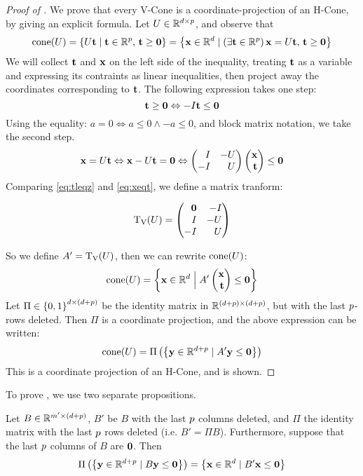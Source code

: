 \begin{proof}[Proof of ]
	We prove that every V-Cone is a coordinate-projection of an H-Cone, by giving an explicit formula.  Let ${U \in \mathbb{R}^{d\times p}}$, and observe that
	\[ \operatorname{cone}(U) = \left\{U\mathbf{t} \;|\; \mathbf{t} \in \mathbb{R}^{p},\, \mathbf{t} \geq \mathbf{0}\right\} =
		\left\{\mathbf{x} \in \mathbb{R}^d \;|\; (\exists \mathbf{t} \in \mathbb{R}^{p})\,\mathbf{x} = U\mathbf{t},\, \mathbf{t} \geq \mathbf{0}\right\} \]
	We will collect $\mathbf{t}$ and $\mathbf{x}$ on the left side of the inequality, treating $\mathbf{t}$ as a variable and expressing its contraints as linear inequalities, then project away the coordinates corresponding to $\mathbf{t}$.  The following expression takes one step:
	\begin{equation}\label{eq:tleqz}
		\mathbf{t} \geq \mathbf{0} \Leftrightarrow -I\mathbf{t} \leq \mathbf{0}
	\end{equation}
	Using the equality: $a = 0 \Leftrightarrow a \leq 0 \land -a \leq 0$, and block matrix notation, we take the second step.
	\begin{equation}\label{eq:xeqt}
		\x = U\t \Leftrightarrow \x - U\t = \0 \Leftrightarrow
		\begin{pmatrix*}[r] I & -U \\ -I & U \end{pmatrix*} \xt \leq \0
	\end{equation}
	Comparing \eqref{eq:tleqz} and \eqref{eq:xeqt}, we define a matrix tranform:
  \begin{Transform}\label{vconelift_transform}
  \[\VLift(U) = \pmb \0 & -I \\ I & -U \\ -I & U \pme \]
  \end{Transform}
  So we define $A' = \operatorname{T_V}(U)$, then we can rewrite $\operatorname{cone}(U)$:
	\begin{equation*}
		\cone(U) = \set{ \xv \St A'\xt \leq \0}
	\end{equation*}
	Let $\Pi \in \left\{0,1\right\}^{d\times(d+p)}$ be the identity matrix in $\mathbb{R}^{(d+p)\times(d+p)}$, but with the last $p$-rows deleted.  Then $\Pi$ is a coordinate projection, and the above expression can be written:
	\begin{equation}\label{eq:vconelift}
		\operatorname{cone}(U) = \Pi\left(\left\{ \mathbf{y} \in \mathbb{R}^{d+p} \;|\; A'\mathbf{y} \leq \mathbf{0}\right\}\right)
	\end{equation}
	This is a coordinate projection of an H-Cone, and  is shown.
\end{proof}

To prove , we use two separate propositions.
\begin{Prop}\label{proj_0_columns}
	Let $B\in\mathbb{R}^{m'\times(d+p)}$, $B'$ be $B$ with the last $p$ columns deleted, and $\Pi$ the identity matrix with the last $p$ rows deleted (i.e. $B' = \Pi B$).  Furthermore, suppose that the last $p$ columns of $B$ are $\mathbf{0}$.  Then
	\[ \Pi\left(\left\{\mathbf{y} \in \mathbb{R}^{d+p} \;|\; B\mathbf{y} \leq \mathbf{0}\right\}\right) =
		\left\{\mathbf{x}\in\mathbb{R}^d\;|\; B'\mathbf{x}\leq\mathbf{0}\right\} \]
\end{Prop}

